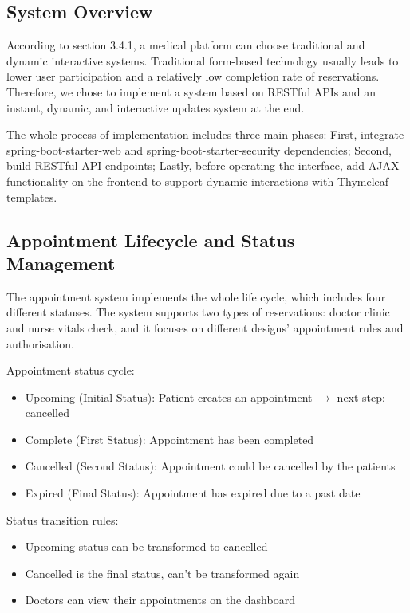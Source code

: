 \subsection{System Overview}
\label{subsec:reservation-overview}

According to section 3.4.1, a medical platform can choose traditional and dynamic interactive systems. Traditional form-based technology usually leads to lower user participation and a relatively low completion rate of reservations. Therefore, we chose to implement a system based on RESTful APIs and an instant, dynamic, and interactive updates system at the end.

The whole process of implementation includes three main phases: First, integrate spring-boot-starter-web and spring-boot-starter-security dependencies; Second, build RESTful API endpoints; Lastly, before operating the interface, add AJAX functionality on the frontend to support dynamic interactions with Thymeleaf templates.

\subsection{Appointment Lifecycle and Status Management}
\label{subsec:appointment-lifecycle}

The appointment system implements the whole life cycle, which includes four different statuses. The system supports two types of reservations: doctor clinic and nurse vitals check, and it focuses on different designs' appointment rules and authorisation.

Appointment status cycle:
\begin{itemize}
    \item Upcoming (Initial Status): Patient creates an appointment $\rightarrow$ next step: cancelled
    \item Complete (First Status): Appointment has been completed
    \item Cancelled (Second Status): Appointment could be cancelled by the patients
    \item Expired (Final Status): Appointment has expired due to a past date
\end{itemize}

Status transition rules:
\begin{itemize}
    \item Upcoming status can be transformed to cancelled
    \item Cancelled is the final status, can't be transformed again
    \item Doctors can view their appointments on the dashboard
\end{itemize}

